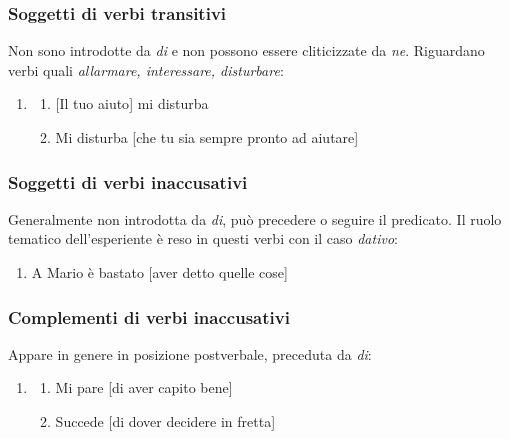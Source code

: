 \documentclass[
  a4paper,
  twoside,
  11pt,
  chapterprefix=false,
  bibliography=totocnumbered,
  listof=flat]{scrbook}
\providecommand{\tightlist}{%
  \setlength{\itemsep}{0pt}\setlength{\parskip}{0pt}}
\begin{document}
\hypertarget{soggetti-di-verbi-transitivi}{%
\subsubsection{Soggetti di verbi transitivi}\label{soggetti-di-verbi-transitivi}}

Non sono introdotte da \emph{di} e non possono essere cliticizzate da \emph{ne}. Riguardano verbi quali \emph{allarmare, interessare, disturbare}:

\begin{enumerate}
\def\labelenumi{(\arabic{enumi})}
\setcounter{enumi}{42}
\item
  \begin{enumerate}
  \def\labelenumii{\alph{enumii}.}
  \tightlist
  \item
    {[}Il tuo aiuto{]} mi disturba
  \item
    Mi disturba {[}che tu sia sempre pronto ad aiutare{]}
  \end{enumerate}
\end{enumerate}

\hypertarget{soggetti-di-verbi-inaccusativi}{%
\subsubsection{Soggetti di verbi inaccusativi}\label{soggetti-di-verbi-inaccusativi}}

Generalmente non introdotta da \emph{di}, può precedere o seguire il predicato.
Il ruolo tematico dell'esperiente è reso in questi verbi con il caso \emph{dativo}:

\begin{enumerate}
\def\labelenumi{(\arabic{enumi})}
\setcounter{enumi}{43}
\tightlist
\item
  A Mario è bastato {[}aver detto quelle cose{]}
\end{enumerate}

\hypertarget{complementi-di-verbi-inaccusativi}{%
\subsubsection{Complementi di verbi inaccusativi}\label{complementi-di-verbi-inaccusativi}}

Appare in genere in posizione postverbale, preceduta da \emph{di}:

\begin{enumerate}
\def\labelenumi{(\arabic{enumi})}
\setcounter{enumi}{44}
\item
  \begin{enumerate}
  \def\labelenumii{\alph{enumii}.}
  \tightlist
  \item
    Mi pare {[}di aver capito bene{]}
  \item
    Succede {[}di dover decidere in fretta{]}
  \end{enumerate}
\end{enumerate}
\end{document}
